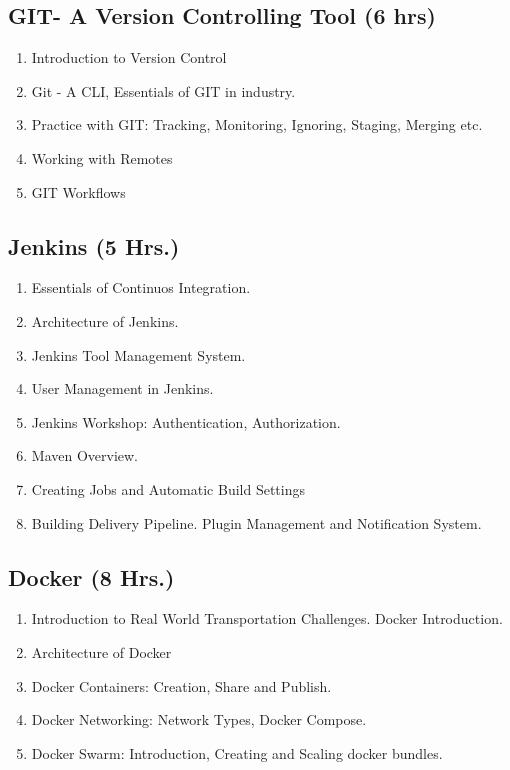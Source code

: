 \subsection{GIT- A Version Controlling Tool \hfill (6 hrs)} 
\begin{enumerate}
    \item Introduction to Version Control
    \item Git - A CLI, Essentials of GIT in industry.
    \item Practice with GIT: Tracking, Monitoring, Ignoring, Staging, Merging etc.
    \item Working with Remotes
    \item GIT Workflows
    
\end{enumerate}


\subsection{Jenkins \hfill (5 Hrs.)}
\begin{enumerate}
    \item Essentials of Continuos Integration.
    \item Architecture of Jenkins.
    \item Jenkins Tool Management System.
    \item User Management in Jenkins.
    \item Jenkins Workshop: Authentication, Authorization.
    \item Maven Overview.
    \item Creating Jobs and Automatic Build Settings
    \item Building Delivery Pipeline. Plugin Management and Notification System.
\end{enumerate}

\subsection{Docker \hfill (8 Hrs.)}

\begin{enumerate}
    \item Introduction to Real World Transportation Challenges. Docker Introduction.
    \item Architecture of Docker
    \item Docker Containers: Creation, Share and Publish.
    \item Docker Networking: Network Types, Docker Compose.
    \item Docker Swarm: Introduction, Creating and Scaling docker bundles.
\end{enumerate}

